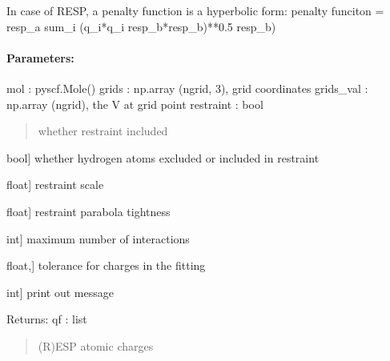 \documentclass[letterpaper,10pt,english]{sphinxmanual}
\begin{document}

\begin{fulllineitems}
\label{\detokenize{fcdft.solvent:fcdft.solvent.esp.esp_fit}}
\pysigstartsignatures
\pysiglinewithargsret
{}
{\sphinxparamcomma {}\sphinxparamcomma {}\sphinxparamcomma {}\sphinxparamcomma {}\sphinxparamcomma {}\sphinxparamcomma {}\sphinxparamcomma {}\sphinxparamcomma {}\sphinxparamcomma {}}
{}
\pysigstopsignatures\begin{description}
\sphinxAtStartPar
In case of RESP, a penalty function is a hyperbolic form:
penalty funciton = resp\_a sum\_i (q\_i*q\_i \sphinxhyphen{} resp\_b*resp\_b)**0.5 \sphinxhyphen{} resp\_b)

\end{description}


\paragraph{Parameters:}
\label{\detokenize{fcdft.solvent:parameters}}
\sphinxAtStartPar
mol : pyscf.Mole()
grids : np.array (ngrid, 3), grid coordinates
grids\_val : np.array (ngrid), the V at grid point
restraint : bool
\begin{quote}

\sphinxAtStartPar
whether restraint included
\end{quote}
\begin{description}
\sphinxlineitem{hfree}{[}bool{]}
\sphinxAtStartPar
whether hydrogen atoms excluded or included in restraint

\sphinxlineitem{resp\_a}{[}float{]}
\sphinxAtStartPar
restraint scale

\sphinxlineitem{resp\_b}{[}float{]}
\sphinxAtStartPar
restraint parabola tightness

\sphinxlineitem{maxiter}{[}int{]}
\sphinxAtStartPar
maximum number of interactions

\sphinxlineitem{tolerance}{[}float,{]}
\sphinxAtStartPar
tolerance for charges in the fitting

\sphinxlineitem{verbose}{[}int{]}
\sphinxAtStartPar
print out message

\end{description}

\sphinxAtStartPar
Returns:
qf : list
\begin{quote}

\sphinxAtStartPar
(R)ESP atomic charges
\end{quote}

\end{fulllineitems}
\end{document}
